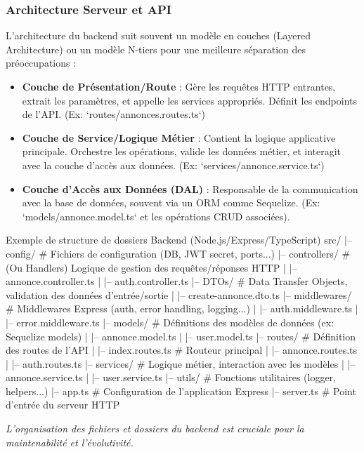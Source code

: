 \documentclass[11pt,a4paper]{report}
\newenvironment{codeblock}[1][Code Example]
  {\begin{tcolorbox}[colback=black!5!white, colframe=HousyGrey!70!black, title=#1, fonttitle=\bfseries\small, arc=2mm, boxrule=0.5pt,breakable]}
  {\end{tcolorbox}}
\begin{document}
\subsubsection{Architecture Serveur et API}
L'architecture du backend suit souvent un modèle en couches (Layered Architecture) ou un modèle N-tiers pour une meilleure séparation des préoccupations :
\begin{itemize}
    \item \textbf{Couche de Présentation/Route} : Gère les requêtes HTTP entrantes, extrait les paramètres, et appelle les services appropriés. Définit les endpoints de l'API. (Ex: `routes/annonces.routes.ts`)
    \item \textbf{Couche de Service/Logique Métier} : Contient la logique applicative principale. Orchestre les opérations, valide les données métier, et interagit avec la couche d'accès aux données. (Ex: `services/annonce.service.ts`)
    \item \textbf{Couche d'Accès aux Données (DAL)} : Responsable de la communication avec la base de données, souvent via un ORM comme Sequelize. (Ex: `models/annonce.model.ts` et les opérations CRUD associées).
\end{itemize}

\begin{codeblock}{Exemple de structure de dossiers Backend (Node.js/Express/TypeScript)}
src/
|-- config/          # Fichiers de configuration (DB, JWT secret, ports...)
|-- controllers/     # (Ou Handlers) Logique de gestion des requêtes/réponses HTTP
|   |-- annonce.controller.ts
|   |-- auth.controller.ts
|-- DTOs/            # Data Transfer Objects, validation des données d'entrée/sortie
|   |-- create-annonce.dto.ts
|-- middlewares/     # Middlewares Express (auth, error handling, logging...)
|   |-- auth.middleware.ts
|   |-- error.middleware.ts
|-- models/          # Définitions des modèles de données (ex: Sequelize models)
|   |-- annonce.model.ts
|   |-- user.model.ts
|-- routes/          # Définition des routes de l'API
|   |-- index.routes.ts  # Routeur principal
|   |-- annonce.routes.ts
|   |-- auth.routes.ts
|-- services/        # Logique métier, interaction avec les modèles
|   |-- annonce.service.ts
|   |-- user.service.ts
|-- utils/           # Fonctions utilitaires (logger, helpers...)
|-- app.ts           # Configuration de l'application Express
|-- server.ts        # Point d'entrée du serveur HTTP
\end{codeblock}
\textit{L'organisation des fichiers et dossiers du backend est cruciale pour la maintenabilité et l'évolutivité.}
\end{document}
